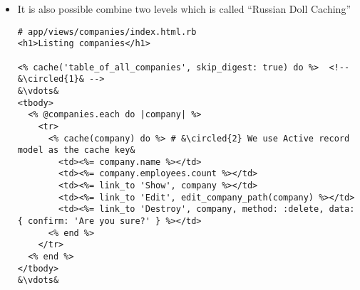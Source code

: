 \documentclass{beamer}
\newcommand*\circled[1]{\tikz[baseline=(char.base)]{
            \node[shape=circle,draw,inner sep=2pt] (char) {#1};}}
\begin{document}
\begin{frame}
\begin{itemize}
\item It is also possible combine two levels which is called ``Russian Doll Caching''

\lstset{language=Ruby, style=eclipse}
\begin{lstlisting}[escapechar=&]
# app/views/companies/index.html.rb
<h1>Listing companies</h1>

<% cache('table_of_all_companies', skip_digest: true) do %>  <!-- &\circled{1}& -->
&\vdots&
<tbody>
  <% @companies.each do |company| %>
    <tr>
      <% cache(company) do %> # &\circled{2} We use Active record model as the cache key&
        <td><%= company.name %></td>
        <td><%= company.employees.count %></td>
        <td><%= link_to 'Show', company %></td>
        <td><%= link_to 'Edit', edit_company_path(company) %></td>
        <td><%= link_to 'Destroy', company, method: :delete, data: { confirm: 'Are you sure?' } %></td>
      <% end %>
    </tr>
  <% end %>
</tbody>
&\vdots&
\end{lstlisting}

\end{itemize}

\end{frame}
\end{document}
